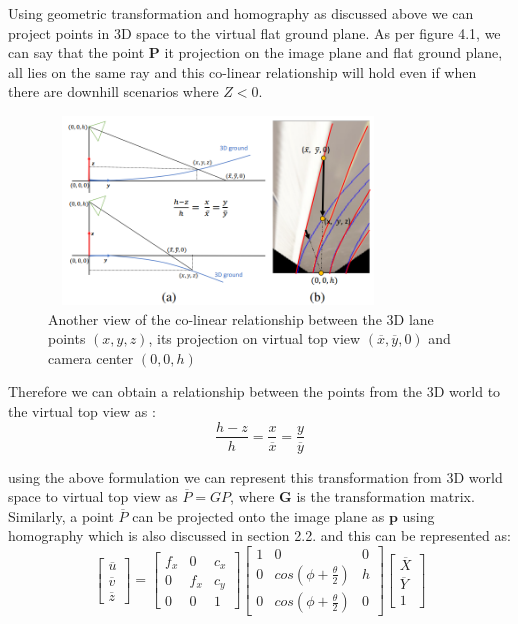    Using geometric transformation and homography as discussed above we can project points in 3D space to the virtual flat ground plane. As per figure 4.1, we can say that the point \textbf{P} it projection on the image plane and flat ground plane, all lies on the same ray and this co-linear relationship will hold even if when there are downhill scenarios where $Z<0$. 
    
      \begin{figure}[h]
    \centering
    \includegraphics[width=9cm, height=5cm]{images/collinear_3dlane.png}
    \caption{Another view of the co-linear relationship between the 3D lane points $(x,y,z)$, its projection on virtual top view $(\overline{x}, \overline{y},0)$ and camera center $(0,0,h)$ \cite{guo2020gen}}
    \end{figure}

    Therefore we can obtain a relationship between the points from the 3D world to the virtual top view as :
    \begin{equation}
        \frac{h-z}{h} =\frac{x}{\overline{x}}=\frac{y}{\overline{y}} 
    \end{equation}
    
    using the above formulation we can represent this transformation from 3D world space to virtual top view as \textbf{$\overline{P} = GP$}, where \textbf{G} is the transformation matrix. Similarly, a point \textbf{$\overline{P}$} can be projected onto the image plane as $\textbf{p}$ using homography which is also discussed in section 2.2. and this can be represented as: 
    \begin{equation}
       \begin{bmatrix}\overline{u}  \\\overline{v} \\ \overline{z}\end{bmatrix} = \begin{bmatrix} f_{x} & 0& c_{x}  \\0 &f_{x} & c_{y} \\ 0 & 0 & 1     \end{bmatrix}\begin{bmatrix} 1 & 0& 0  \\0 &cos(\phi+ \frac{\theta}{2}) & h \\ 0 &cos(\phi+ \frac{\theta}{2}) & 0     \end{bmatrix}\begin{bmatrix}\overline{X}  \\\overline{Y} \\ 1\end{bmatrix}
    \end{equation}

